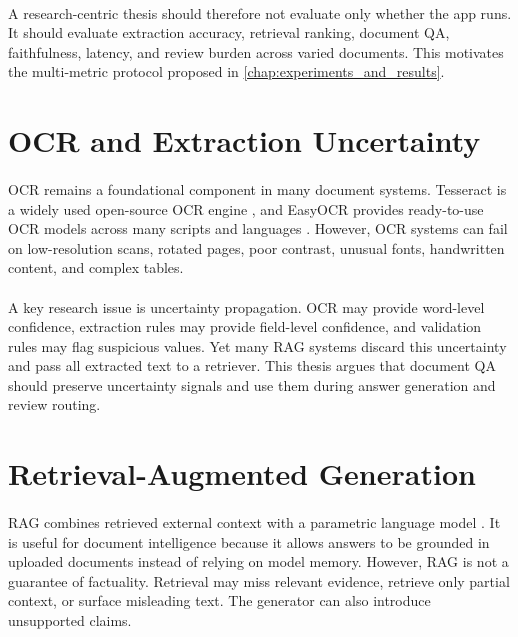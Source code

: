 \paragraph{} A research-centric thesis should therefore not evaluate only whether the app runs. It should evaluate extraction accuracy, retrieval ranking, document QA, faithfulness, latency, and review burden across varied documents. This motivates the multi-metric protocol proposed in \cref{chap:experiments_and_results}.

\section{OCR and Extraction Uncertainty}
\paragraph{} OCR remains a foundational component in many document systems. Tesseract is a widely used open-source OCR engine \cite{smith2007tesseract}, and EasyOCR provides ready-to-use OCR models across many scripts and languages \cite{easyocr2026}. However, OCR systems can fail on low-resolution scans, rotated pages, poor contrast, unusual fonts, handwritten content, and complex tables.

\paragraph{} A key research issue is uncertainty propagation. OCR may provide word-level confidence, extraction rules may provide field-level confidence, and validation rules may flag suspicious values. Yet many RAG systems discard this uncertainty and pass all extracted text to a retriever. This thesis argues that document QA should preserve uncertainty signals and use them during answer generation and review routing.

\section{Retrieval-Augmented Generation}
\paragraph{} RAG combines retrieved external context with a parametric language model \cite{lewis2020rag}. It is useful for document intelligence because it allows answers to be grounded in uploaded documents instead of relying on model memory. However, RAG is not a guarantee of factuality. Retrieval may miss relevant evidence, retrieve only partial context, or surface misleading text. The generator can also introduce unsupported claims.

